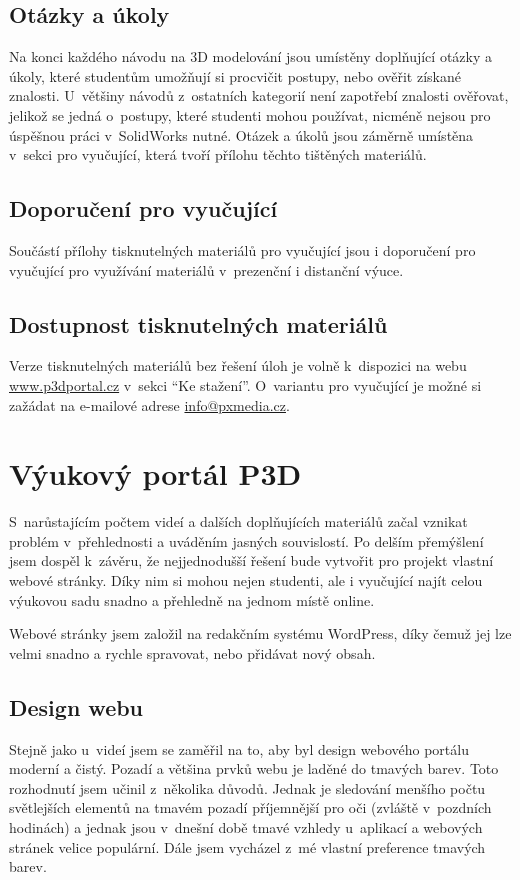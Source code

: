 \subsection{Otázky a úkoly}
Na konci každého návodu na 3D modelování jsou umístěny doplňující otázky a úkoly, které studentům umožňují si procvičit postupy, nebo ověřit získané znalosti.
U~většiny návodů z~ostatních kategorií není zapotřebí znalosti ověřovat, jelikož se jedná o~postupy, které studenti mohou používat, nicméně nejsou pro úspěšnou práci v~SolidWorks nutné.
Otázek a úkolů jsou záměrně umístěna v~sekci pro vyučující, která tvoří přílohu těchto tištěných materiálů.

\subsection*{Doporučení pro vyučující}
Součástí přílohy tisknutelných materiálů pro vyučující jsou i doporučení pro vyučující pro využívání materiálů v~prezenční i distanční výuce.

\subsection{Dostupnost tisknutelných materiálů}
Verze tisknutelných materiálů bez řešení úloh je volně k~dispozici na webu \href{https://www.p3dportal.cz}{www.p3dportal.cz} v~sekci \enquote{Ke stažení}.
O~variantu pro vyučující je možné si zažádat na e-mailové adrese \href{mailto:info@pxmedia.cz}{info@pxmedia.cz}.

\section{Výukový portál P3D}
S~narůstajícím počtem videí a dalších doplňujících materiálů začal vznikat problém v~přehlednosti a uváděním jasných souvislostí.
Po delším přemýšlení jsem dospěl k~závěru, že nejjednodušší řešení bude vytvořit pro projekt vlastní webové stránky.
Díky nim si mohou nejen studenti, ale i vyučující najít celou výukovou sadu snadno a přehledně na jednom místě online.

Webové stránky jsem založil na redakčním systému WordPress, díky čemuž jej lze velmi snadno a rychle spravovat, nebo přidávat nový obsah.

\subsection{Design webu}
Stejně jako u~videí jsem se zaměřil na to, aby byl design webového portálu moderní a čistý.
Pozadí a většina prvků webu je laděné do tmavých barev.
Toto rozhodnutí jsem učinil z~několika důvodů.
Jednak je sledování menšího počtu světlejších elementů na tmavém pozadí příjemnější pro oči (zvláště v~pozdních hodinách) a jednak jsou v~dnešní době tmavé vzhledy u~aplikací a webových stránek velice populární.
Dále jsem vycházel z~mé vlastní preference tmavých barev.

